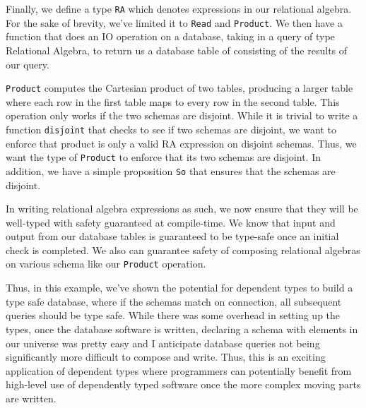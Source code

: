 Finally, we define a type \texttt{RA} which denotes expressions in our
relational algebra. For the sake of brevity, we've limited it to \texttt{Read}
and \texttt{Product}. We then have a function that does an IO operation on a
database, taking in a query of type Relational Algebra, to return us a database
table of consisting of the results of our query. 

\texttt{Product} computes the Cartesian product of two tables, producing a
larger table where each row in the first table maps to every row in the second
table. This operation only works if the two schemas are disjoint. While it is
trivial to write a function \texttt{disjoint} that checks to see if two schemas
are disjoint, we want to enforce that product is only a valid RA expression on
disjoint schemas. Thus, we want the type of \texttt{Product} to enforce that its
two schemas are disjoint. In addition, we have a simple proposition \texttt{So}
that ensures that the schemas are disjoint. 

In writing relational algebra expressions as such, we now ensure that they will
be well-typed with safety guaranteed at compile-time. We know that input and
output from our database tables is guaranteed to be type-safe once an initial
check is completed. We also can guarantee safety of composing relational
algebras on various schema like our \texttt{Product} operation. 

Thus, in this example, we've shown the potential for dependent types to build a
type safe database, where if the schemas match on connection, all subsequent
queries should be type safe. While there was some overhead in setting up the
types, once the database software is written, declaring a schema with elements
in our universe was pretty easy and I anticipate database queries not being
significantly more difficult to compose and write. Thus, this is an exciting
application of dependent types where programmers can potentially benefit from
high-level use of dependently typed software once the more complex moving parts
are written. 

